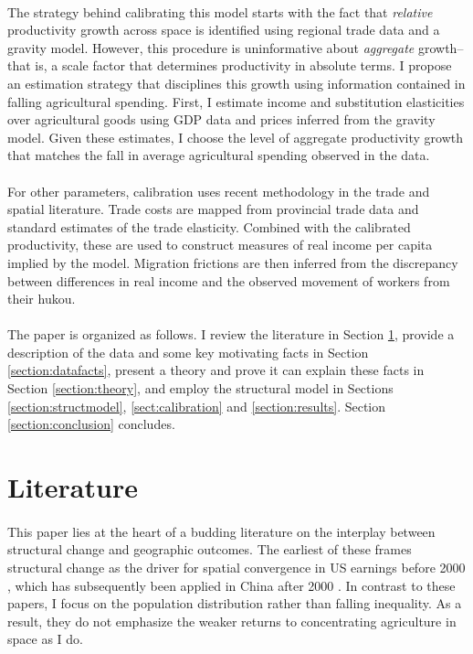 \documentclass[]{article}
\theoremstyle{plain}
\begin{document}
\paragraph*{}
The strategy behind calibrating this model starts with the fact that \textit{relative} productivity growth across space is identified using regional trade data and a gravity model. However, this procedure is uninformative about \textit{aggregate} growth-- that is, a scale factor that determines productivity in absolute terms. I propose an estimation strategy that disciplines this growth using information contained in falling agricultural spending. First, I estimate income and substitution elasticities over agricultural goods using GDP data and prices inferred from the gravity model. Given these estimates, I choose the level of aggregate productivity growth that matches the fall in average agricultural spending observed in the data. 
\paragraph*{}
For other parameters, calibration uses recent methodology in the trade and spatial literature. Trade costs are mapped from provincial trade data and standard estimates of the trade elasticity. Combined with the calibrated productivity, these are used to construct measures of real income per capita implied by the model. Migration frictions are then inferred from the discrepancy between differences in real income and the observed movement of workers from their hukou.

\paragraph*{}
The paper is organized as follows. I review the literature in Section \ref{section:literature}, provide a description of the data and some key motivating facts in Section \ref{section:datafacts}, present a theory and prove it can explain these facts in Section \ref{section:theory}, and employ the structural model in Sections \ref{section:structmodel}, \ref{sect:calibration} and \ref{section:results}. Section \ref{section:conclusion} concludes.

\section{Literature}\label{section:literature}
\paragraph*{}
This paper lies at the heart of a budding literature on the interplay between structural change and geographic outcomes. The earliest of these frames structural change as the driver for spatial convergence in US earnings before 2000 \citep{casellicoleman}, which has subsequently been applied in China after 2000 \citep{hao2020}. In contrast to these papers, I focus on the population distribution rather than falling inequality. As a result, they do not emphasize the weaker returns to concentrating agriculture in space as I do. 
\end{document}

